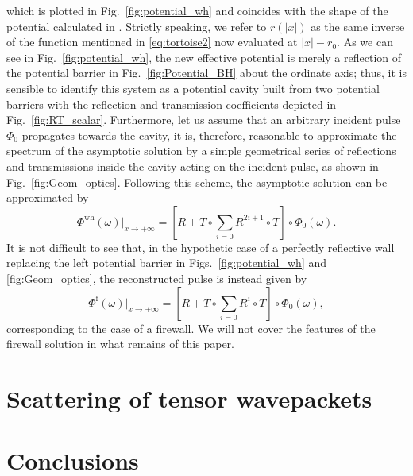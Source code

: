 \documentclass[article,aps,nofootinbib,twocolumn,superscriptaddress]{revtex4-1}
\begin{document}
which is plotted in Fig.~\ref{fig:potential_wh} and coincides with the shape of the potential calculated in \citep{Cardoso:2016oxy}. Strictly speaking, we refer to $r\left(|x|\right)$ as the same inverse of the function mentioned in \eqref{eq:tortoise2} now evaluated at $|x|-r_0$. As we can see in Fig.~\ref{fig:potential_wh}, the new effective potential is merely a reflection of the potential barrier in Fig.~\ref{fig:Potential_BH} about the ordinate axis; thus, it is sensible to identify this system as a potential cavity built from two potential barriers with the reflection and transmission coefficients depicted in Fig.~\ref{fig:RT_scalar}. Furthermore, let us assume that an arbitrary incident pulse $\Phi_0$ propagates towards the cavity, it is, therefore, reasonable to approximate the spectrum of the asymptotic solution by a simple geometrical series of reflections and transmissions inside the cavity acting on the incident pulse, as shown in Fig.~\ref{fig:Geom_optics}. Following this scheme, the asymptotic solution can be approximated by
\begin{equation}
\Phi^{\mathrm{wh}}(\omega)|_{x\rightarrow+\infty}=\left[R+T\circ\sum_{i=0}R^{2i+1}\circ T\right]\circ\Phi_0(\omega).
\label{eq:reconst}
\end{equation}
It is not difficult to see that, in the hypothetic case of a perfectly reflective wall replacing the left potential barrier in Figs.~\ref{fig:potential_wh} and \ref{fig:Geom_optics}, the reconstructed pulse is instead given by 
\begin{equation}
\Phi^{\mathrm{f}}(\omega)|_{x\rightarrow+\infty}=\left[R+T\circ\sum_{i=0}R^i\circ T\right]\circ\Phi_0(\omega),
\label{eq:reconst_firewall}
\end{equation}
corresponding to the case of a firewall. We will not cover the features of the firewall solution in what remains of this paper.
\section{Scattering of tensor wavepackets}\label{sec:tensor} 
\section{Conclusions}\label{sec:conclusions}


\end{document}

